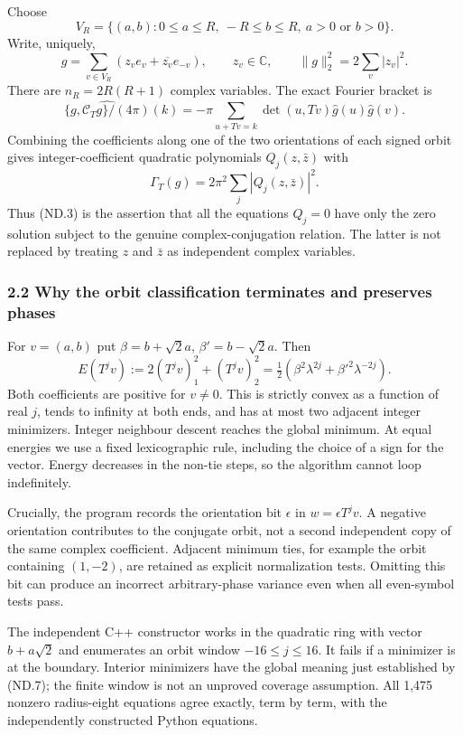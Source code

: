 Choose \[
 V_R=\{(a,b):0\leq a\leq R,\ -R\leq b\leq R,
                         \ a>0\text{ or }b>0\}.
\] Write, uniquely, \[
 g=\sum_{v\in V_R}(z_v e_v+\overline{z_v}e_{-v}),\qquad
 z_v\in\mathbb C,\qquad \|g\|_2^2=2\sum_v|z_v|^2.          \tag{ND.4}
\] There are \(n_R=2R(R+1)\) complex variables. The exact Fourier bracket is \[
 \widehat{\{g,\mathcal C_Tg\}/(4\pi)}(k)
       =-\pi\sum_{u+Tv=k}\det(u,Tv)\widehat g(u)\widehat g(v).
 \tag{ND.5}
\] Combining the coefficients along one of the two orientations of each signed orbit gives integer-coefficient quadratic polynomials \(Q_j(z,\bar z)\) with \[
                   \Gamma_T(g)=2\pi^2\sum_j|Q_j(z,\bar z)|^2. \tag{ND.6}
\] Thus (ND.3) is the assertion that all the equations \(Q_j=0\) have only the zero solution subject to the genuine complex-conjugation relation. The latter is not replaced by treating \(z\) and \(\bar z\) as independent complex variables.

\subsubsection{2.2 Why the orbit classification terminates and preserves phases}\label{nondegeneracy:why-the-orbit-classification-terminates-and-preserves-phases}

For \(v=(a,b)\) put \(\beta=b+\sqrt2 a\), \(\beta'=b-\sqrt2 a\). Then \[
 E(T^jv):=2(T^jv)_1^2+(T^jv)_2^2
       =\tfrac12(\beta^2\lambda^{2j}+\beta'^2\lambda^{-2j}). \tag{ND.7}
\] Both coefficients are positive for \(v\ne0\). This is strictly convex as a function of real \(j\), tends to infinity at both ends, and has at most two adjacent integer minimizers. Integer neighbour descent reaches the global minimum. At equal energies we use a fixed lexicographic rule, including the choice of a sign for the vector. Energy decreases in the non-tie steps, so the algorithm cannot loop indefinitely.

Crucially, the program records the orientation bit \(\epsilon\) in \(w=\epsilon T^jv\). A negative orientation contributes to the conjugate orbit, not a second independent copy of the same complex coefficient. Adjacent minimum ties, for example the orbit containing \((1,-2)\), are retained as explicit normalization tests. Omitting this bit can produce an incorrect arbitrary-phase variance even when all even-symbol tests pass.

The independent C++ constructor works in the quadratic ring with vector \(b+a\sqrt2\) and enumerates an orbit window \(-16\leq j\leq16\). It fails if a minimizer is at the boundary. Interior minimizers have the global meaning just established by (ND.7); the finite window is not an unproved coverage assumption. All 1,475 nonzero radius-eight equations agree exactly, term by term, with the independently constructed Python equations.

